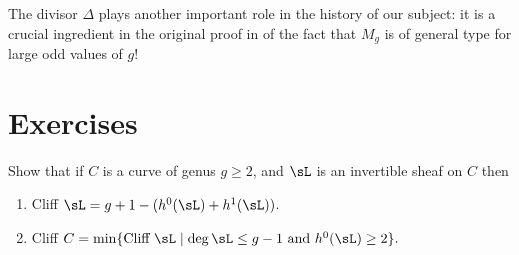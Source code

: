 The divisor $\Delta$ plays another important role
in the history of our subject: it is a crucial ingredient in the original proof in
\cite{Harris-MumfordModuli} of the fact that $M_{g}$ is of general type for large odd values of $g$!

\section{Exercises}

\begin{exercise}\label{forms of Clifford}
Show that if $C$ is a curve of genus $g\geq 2$, 
and $\sL$ is an invertible sheaf on $C$ then 
\begin{enumerate}
 \item Cliff $\sL = g+1-(h^{0}(\sL)+h^{1}(\sL))$.
 \item Cliff $C = \min\{\hbox {Cliff }\sL \mid \deg \sL \leq g-1 \hbox{ and } h^{0}(\sL) \geq 2\}.$
\end{enumerate}
\end{exercise}

